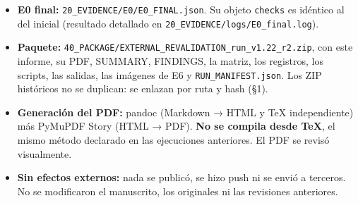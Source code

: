 \documentclass[
]{article}
\providecommand{\tightlist}{%
  \setlength{\itemsep}{0pt}\setlength{\parskip}{0pt}}
\begin{document}
\begin{itemize}
\tightlist
\item
  \textbf{E0 final:} \texttt{20\_EVIDENCE/E0/E0\_FINAL.json}. Su objeto
  \texttt{checks} es idéntico al del inicial (resultado detallado en
  \texttt{20\_EVIDENCE/logs/E0\_final.log}).
\item
  \textbf{Paquete:}
  \texttt{40\_PACKAGE/EXTERNAL\_REVALIDATION\_run\_v1.22\_r2.zip}, con
  este informe, su PDF, SUMMARY, FINDINGS, la matriz, los registros, los
  scripts, las salidas, las imágenes de E6 y
  \texttt{RUN\_MANIFEST.json}. Los ZIP históricos no se duplican: se
  enlazan por ruta y hash (§1).
\item
  \textbf{Generación del PDF:} pandoc (Markdown → HTML y TeX
  independiente) más PyMuPDF Story (HTML → PDF). \textbf{No se compila
  desde TeX}, el mismo método declarado en las ejecuciones anteriores.
  El PDF se revisó visualmente.
\item
  \textbf{Sin efectos externos:} nada se publicó, se hizo push ni se
  envió a terceros. No se modificaron el manuscrito, los originales ni
  las revisiones anteriores.
\end{itemize}
\end{document}
